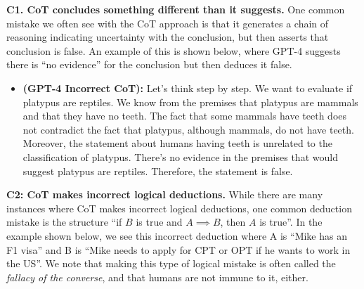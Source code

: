 \documentclass[11pt]{article}
\begin{document}
\textbf{C1. CoT concludes something different than it suggests.} One common mistake we often see with the CoT approach is that it generates a chain of reasoning indicating uncertainty with the conclusion, but then asserts that conclusion is false. An example of this is shown below, where GPT-4 suggests there is ``no evidence'' for the conclusion but then deduces it false.

\begin{itemize}
    \item[] \small \textbf{(GPT-4 Incorrect CoT):} Let's think step by step. We want to evaluate if platypus are reptiles. We know from the premises that platypus are mammals and that they have no teeth. The fact that some mammals have teeth does not contradict the fact that platypus, although mammals, do not have teeth. Moreover, the statement about humans having teeth is unrelated to the classification of platypus. There's no evidence in the premises that would suggest platypus are reptiles. Therefore, the statement is false.
\end{itemize}

\textbf{C2: CoT makes incorrect logical deductions.} While there are many instances where CoT makes incorrect logical deductions, one common deduction mistake is the structure ``if $B$ is true and $A \implies B$, then $A$ is true''. In the example shown below, we see this incorrect deduction where A is ``Mike has an F1 visa'' and B is ``Mike needs to apply for CPT or OPT if he wants to work in the US''. We note that making this type of logical mistake is often called the \emph{fallacy of the converse}, and that humans are not immune to it, either.
\end{document}
